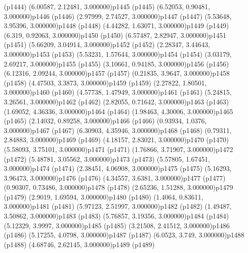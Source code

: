 \psdot(p1444)
\psPoint(6.00587, 2.12481, 3.000000){p1445}
\psdot(p1445)
\psPoint(6.52053, 0.90481, 3.000000){p1446}
\psdot(p1446)
\psPoint(2.97999, 2.74527, 3.000000){p1447}
\psdot(p1447)
\psPoint(5.53648, 3.95396, 3.000000){p1448}
\psdot(p1448)
\psPoint(4.44282, 1.63071, 3.000000){p1449}
\psdot(p1449)
\psPoint(6.319, 0.92063, 3.000000){p1450}
\psdot(p1450)
\psPoint(6.57487, 2.82947, 3.000000){p1451}
\psdot(p1451)
\psPoint(5.66209, 3.04914, 3.000000){p1452}
\psdot(p1452)
\psPoint(2.28347, 3.44643, 3.000000){p1453}
\psdot(p1453)
\psPoint(5.53231, 1.57644, 3.000000){p1454}
\psdot(p1454)
\psPoint(3.03179, 2.69217, 3.000000){p1455}
\psdot(p1455)
\psPoint(3.10661, 0.94185, 3.000000){p1456}
\psdot(p1456)
\psPoint(6.12316, 2.09244, 3.000000){p1457}
\psdot(p1457)
\psPoint(0.21835, 3.9647, 3.000000){p1458}
\psdot(p1458)
\psPoint(4.47503, 3.3873, 3.000000){p1459}
\psdot(p1459)
\psPoint(2.27822, 1.80501, 3.000000){p1460}
\psdot(p1460)
\psPoint(4.57738, 1.47949, 3.000000){p1461}
\psdot(p1461)
\psPoint(5.24815, 3.26561, 3.000000){p1462}
\psdot(p1462)
\psPoint(2.82055, 0.71642, 3.000000){p1463}
\psdot(p1463)
\psPoint(1.69052, 4.36336, 3.000000){p1464}
\psdot(p1464)
\psPoint(1.98463, 4.30006, 3.000000){p1465}
\psdot(p1465)
\psPoint(2.14032, 0.89258, 3.000000){p1466}
\psdot(p1466)
\psPoint(0.93934, 1.0376, 3.000000){p1467}
\psdot(p1467)
\psPoint(6.30903, 4.35946, 3.000000){p1468}
\psdot(p1468)
\psPoint(0.79311, 2.84883, 3.000000){p1469}
\psdot(p1469)
\psPoint(4.18157, 2.83021, 3.000000){p1470}
\psdot(p1470)
\psPoint(5.58093, 3.75101, 3.000000){p1471}
\psdot(p1471)
\psPoint(1.76866, 3.71907, 3.000000){p1472}
\psdot(p1472)
\psPoint(5.48781, 3.05562, 3.000000){p1473}
\psdot(p1473)
\psPoint(5.57805, 1.67451, 3.000000){p1474}
\psdot(p1474)
\psPoint(2.38451, 4.06908, 3.000000){p1475}
\psdot(p1475)
\psPoint(5.16293, 3.96473, 3.000000){p1476}
\psdot(p1476)
\psPoint(4.34557, 3.6381, 3.000000){p1477}
\psdot(p1477)
\psPoint(0.90307, 0.73486, 3.000000){p1478}
\psdot(p1478)
\psPoint(2.65236, 1.51288, 3.000000){p1479}
\psdot(p1479)
\psPoint(2.9019, 1.69594, 3.000000){p1480}
\psdot(p1480)
\psPoint(1.4064, 0.83611, 3.000000){p1481}
\psdot(p1481)
\psPoint(5.97123, 2.51997, 3.000000){p1482}
\psdot(p1482)
\psPoint(1.49487, 3.50862, 3.000000){p1483}
\psdot(p1483)
\psPoint(5.76857, 3.19356, 3.000000){p1484}
\psdot(p1484)
\psPoint(5.12329, 3.9997, 3.000000){p1485}
\psdot(p1485)
\psPoint(3.21508, 2.41512, 3.000000){p1486}
\psdot(p1486)
\psPoint(5.17255, 4.0798, 3.000000){p1487}
\psdot(p1487)
\psPoint(6.0523, 3.749, 3.000000){p1488}
\psdot(p1488)
\psPoint(4.68746, 2.62145, 3.000000){p1489}
\psdot(p1489)
